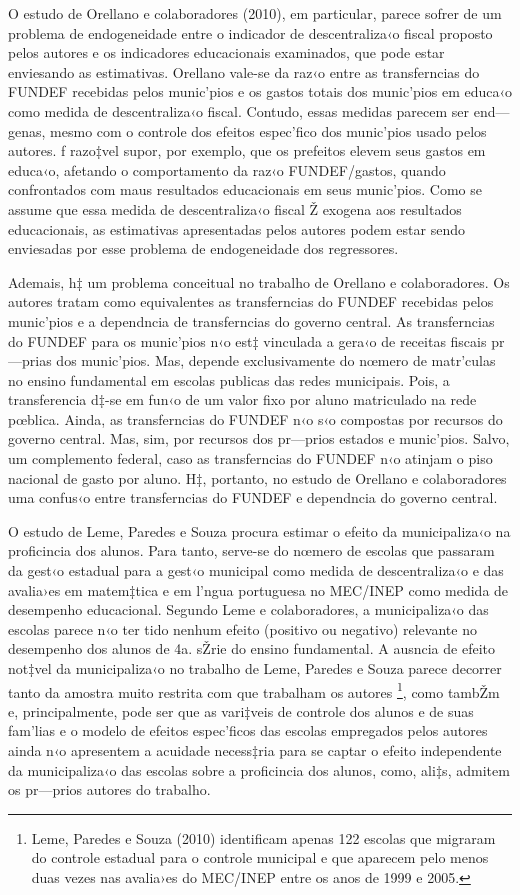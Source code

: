 \documentclass[a4paper, 12pt]{article}
\begin{document}
O estudo de Orellano e colaboradores (2010), em particular, parece sofrer de um problema de endogeneidade entre o indicador de descentraliza‹o fiscal proposto pelos autores e os indicadores educacionais examinados, que pode estar enviesando as estimativas. Orellano vale-se da raz‹o entre as transferncias do FUNDEF recebidas pelos munic’pios e os gastos totais dos munic’pios em educa‹o como medida de descentraliza‹o fiscal. Contudo, essas medidas parecem ser end—genas, mesmo com o controle dos efeitos espec’fico dos munic’pios usado pelos autores. ƒ razo‡vel supor, por exemplo, que os prefeitos elevem seus gastos em educa‹o, afetando o comportamento da raz‹o FUNDEF/gastos, quando confrontados com maus resultados educacionais em seus munic’pios. Como se assume que essa medida de descentraliza‹o fiscal Ž exogena aos resultados educacionais, as estimativas apresentadas pelos autores podem estar sendo enviesadas por esse problema de endogeneidade dos regressores.

Ademais, h‡ um problema conceitual no trabalho de Orellano e colaboradores. Os autores tratam como equivalentes as transferncias do FUNDEF recebidas pelos munic’pios e a dependncia de transferncias do governo central. As transferncias do FUNDEF para os munic’pios n‹o est‡ vinculada a gera‹o de receitas fiscais pr—prias dos munic’pios. Mas, depende exclusivamente do nœmero de matr’culas no ensino fundamental em escolas publicas das redes municipais. Pois, a transferencia d‡-se em fun‹o de um valor fixo por aluno matriculado na rede pœblica. Ainda, as transferncias do FUNDEF n‹o s‹o compostas por recursos do governo central. Mas, sim, por recursos dos pr—prios estados e munic’pios. Salvo, um complemento federal, caso as transferncias do FUNDEF n‹o atinjam o piso nacional de gasto por aluno. H‡, portanto, no estudo de Orellano e colaboradores uma confus‹o entre transferncias do FUNDEF e dependncia do governo central. 

O estudo de Leme, Paredes e Souza \citeyear{leme_municipalizacao_2009} procura estimar o efeito da municipaliza‹o na proficincia dos alunos. Para tanto, serve-se do nœmero de escolas que passaram da gest‹o estadual para a gest‹o municipal como medida de descentraliza‹o e das avalia›es em matem‡tica e em l’ngua portuguesa no MEC/INEP  como medida de desempenho educacional. Segundo Leme e colaboradores, a municipaliza‹o das escolas parece n‹o ter tido nenhum efeito (positivo ou negativo) relevante no desempenho dos alunos de 4a. sŽrie do ensino fundamental. A ausncia de efeito not‡vel da municipaliza‹o no trabalho de Leme, Paredes e Souza parece decorrer tanto da amostra muito restrita com que trabalham os autores \footnote{Leme, Paredes e Souza (2010) identificam apenas 122 escolas que migraram do controle estadual para o controle municipal e que aparecem pelo menos duas vezes nas avalia›es do MEC/INEP entre os anos de 1999 e 2005.}, como tambŽm e, principalmente, pode ser que as vari‡veis de controle dos alunos e de suas fam’lias e o modelo de efeitos espec’ficos das escolas empregados pelos autores ainda n‹o apresentem a acuidade necess‡ria para se captar o efeito independente da municipaliza‹o das escolas sobre a proficincia dos alunos, como, ali‡s, admitem os pr—prios autores do trabalho. 
\end{document}
